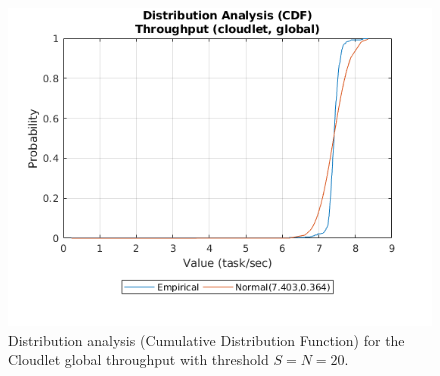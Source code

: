 \begin{figure}
	\includegraphics[width=\columnwidth]{fig/evaluation-distribution-analysis-cdf-throughput-cloudlet-global}
	\caption{Distribution analysis (Cumulative Distribution Function) for the Cloudlet global throughput with threshold $S=N=20$.}
	\label{fig:evaluation-distribution-analysis-cdf-throughput-cloudlet-global}
\end{figure}